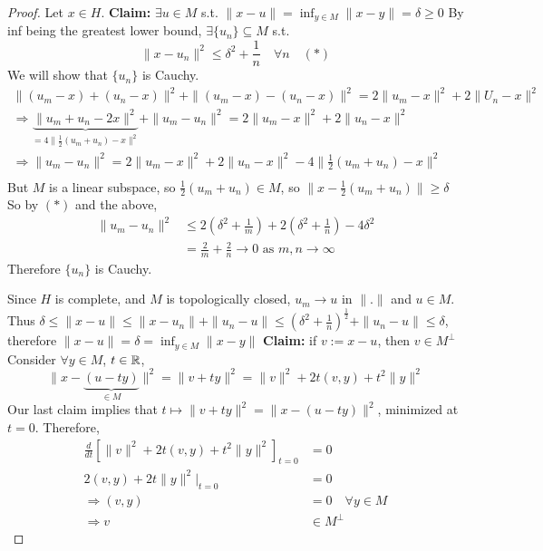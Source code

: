 \begin{proof}
    Let $x \in H$.
    \newline\textbf{Claim:} $\exists u \in M$ s.t. $\| x - u \| = \inf_{y \in M} \| x - y \| = 
    \delta \geq 0  $   
    \newline\noindent By inf being the greatest lower bound, $\exists \{u_n\} \subseteq M$ s.t.
    \[
        \| x - u_n \|^2 \leq \delta^2 + \frac{1}{n} \quad \forall n \quad (*) 
    \]  
    We will show that $\{u_n\}$ is Cauchy. 
    \begin{align*}
        \| (u_m - x) + (u_n - x) \|^2 + \| (u_m - x) - (u_n - x) \|^2 = 
        2\| u_m - x \|^2 + 2\| U_n - x \|^2   \\
        \Rightarrow \underbrace{\| u_m + u_n - 2x \|^2}_{ = 4\| \frac{1}{2} (u_m + u_n) - x \|^2 } + \| u_m - u_n \|^2 = 2 \| u_m - x \|^2 + 2\| u_n - x \|^2 \\
        \Rightarrow \| u_m - u_n \|^2 = 2\| u_m - x \|^2 + 2\| u_n - x \|^2 - 4\| \frac{1}{2} (u_m + u_n) - x \|^2 \\    
    \end{align*} 
    But $M$ is a linear subspace, so $\frac{1}{2}(u_m + u_n) \in M$, so
    $\| x - \frac{1}{2}(u_m + u_n) \| \geq \delta $
    So by $(*)$ and the above, 
    \begin{align*}
    \| u_m - u_n \|^2 &\leq 2(\delta^2 + \frac{1}{m})+ 2(\delta^2 + \frac{1}{n}) - 4\delta^2 \\
    &= \frac{2}{m} + \frac{2}{n} \to 0 \text{ as } m, n \to \infty
    \end{align*}
    Therefore $\{u_n\}$ is Cauchy.
    
    Since $H$ is complete, and $M$ is topologically closed, $u_m \to u$ in $\|  .  \| $ and $u \in M$.
    Thus $\delta \leq \| x - u \| \leq \| x- u_n \| + \| u_n - u \| \leq (\delta^2 + \frac{1}{n})^{\frac{1}{2}}
    + \| u_n - u \| \leq \delta$, therefore $\| x - u \| = \delta = \inf_{y \in M} \| x - y \|$
    \newline\textbf{Claim:} if $v := x - u$, then $v \in M^\perp$
    \newline \noindent Consider $\forall y \in M$, $t \in \mathbb{R}$, 
    \[
        \| x - \underbrace{(u - ty)}_{\in M} \|^2 = \| v + ty \|^2 = \| v \|^2 + 2t(v, y) + t^2 \| y \|^2    
    \]    
    Our last claim implies that $t \mapsto \| v + ty \|^2 = \| x - (u - ty) \|^2$, minimized at $t = 0$.
    Therefore,
    \begin{align*}
        \frac{d}{dt} \left[ \| v \|^2 + 2t(v, y) + t^2 \| y \|^2 \right]_{t = 0} &= 0 \\
        2(v, y) + 2t \| y \|^2 |_{t = 0} &= 0 \\
        \Rightarrow (v, y) &= 0 \quad \forall y \in M \\
        \Rightarrow v &\in M^\perp 
    \end{align*}


\end{proof}
